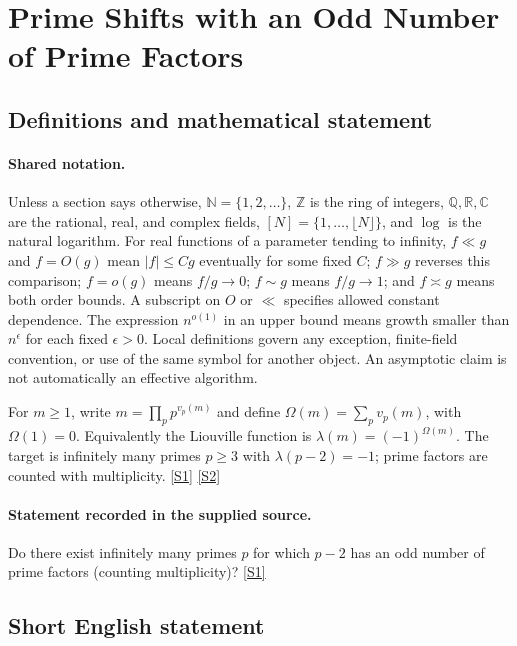\documentclass[11pt,a4paper]{article}
\newcommand{\N}{\mathbb{N}}
\newcommand{\Z}{\mathbb{Z}}
\newcommand{\Q}{\mathbb{Q}}
\newcommand{\R}{\mathbb{R}}
\newcommand{\C}{\mathbb{C}}
\newcommand{\sref}[2]{\hyperlink{source:#1:#2}{[S#2]}}
\begin{document}
\section{Prime Shifts with an Odd Number of Prime Factors}\label{statement}


\subsection{Definitions and mathematical statement}

\paragraph{Shared notation.}Unless a section says otherwise, $\N=\{1,2,\ldots\}$,
$\Z$ is the ring of integers, $\Q,\R,\C$ are the rational, real, and complex
fields, $[N]=\{1,\ldots,\lfloor N\rfloor\}$, and $\log$ is the natural
logarithm. For real functions of a parameter tending to infinity,
$f\ll g$ and $f=O(g)$ mean $|f|\leq Cg$ eventually for some fixed $C$;
$f\gg g$ reverses this comparison; $f=o(g)$ means $f/g\to0$;
$f\sim g$ means $f/g\to1$; and $f\asymp g$ means both order bounds.
A subscript on $O$ or $\ll$ specifies allowed constant dependence.
The expression $n^{o(1)}$ in an upper bound means growth smaller than
$n^\epsilon$ for each fixed $\epsilon>0$. Local definitions govern any
exception, finite-field convention, or use of the same symbol for another
object. An asymptotic claim is not automatically an effective algorithm.



For $m\geq1$, write $m=\prod_p p^{v_p(m)}$ and define $\Omega(m)=\sum_p v_p(m)$, with $\Omega(1)=0$. Equivalently the Liouville function is $\lambda(m)=(-1)^{\Omega(m)}$. The target is infinitely many primes $p\geq3$ with $\lambda(p-2)=-1$; prime factors are counted with multiplicity. \sref{statement}{1} \sref{statement}{2}

\paragraph{Statement recorded in the supplied source.}
Do there exist infinitely many primes $p$ for which $p-2$ has an odd number of prime factors (counting multiplicity)? \sref{statement}{1}

\subsection{Short English statement}
\end{document}
